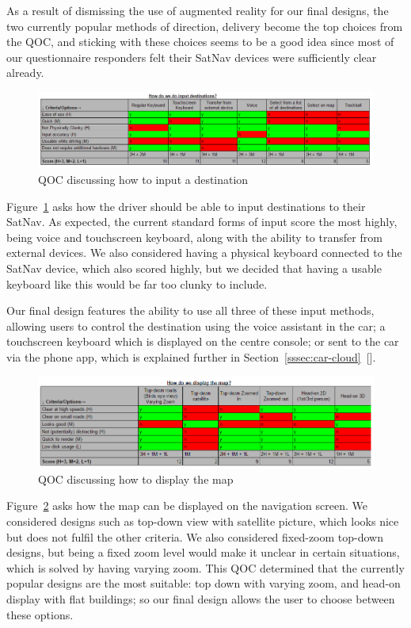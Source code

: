 \documentclass{article}
\begin{document}
As a result of dismissing the use of augmented reality for our final designs, the two currently popular methods of direction, delivery become the top choices from the QOC, and sticking with these choices seems to be a good idea since most of our questionnaire responders felt their SatNav devices were sufficiently clear already.

\begin{figure}[H]
  \centering
  \includegraphics[width=\linewidth]{qoc-nav-input}
  \caption{QOC discussing how to input a destination}\label{qoc-input}
\end{figure}

Figure~\ref{qoc-input} asks how the driver should be able to input destinations to their SatNav. As expected, the current standard forms of input score the most highly, being voice and touchscreen keyboard, along with the ability to transfer from external devices. We also considered having a physical keyboard connected to the SatNav device, which also scored highly, but we decided that having a usable keyboard like this would be far too clunky to include.

Our final design features the ability to use all three of these input methods, allowing users to control the destination using the voice assistant
%
%
in the car; a touchscreen keyboard which is displayed on the centre console; or sent to the car via the phone app, which is explained further in Section~\ref{sssec:car-cloud}~[].

\begin{figure}[H]
  \centering
  \includegraphics[width=\linewidth]{qoc-nav-map}
  \caption{QOC discussing how to display the map}\label{qoc-map}
\end{figure}
Figure~\ref{qoc-map} asks how the map can be displayed on the navigation screen. We considered designs such as top-down view with satellite picture, which looks nice but does not fulfil the other criteria. We also considered fixed-zoom top-down designs, but being a fixed zoom level would make it unclear in certain situations, which is solved by having varying zoom. This QOC determined that the currently popular designs are the most suitable: top down with varying zoom, and head-on display with flat buildings; so our final design allows the user to choose between these options.
\end{document}

